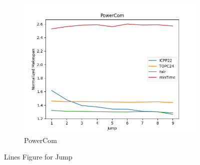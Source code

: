 \documentclass{article}
\begin{document}
\begin{figure}[htbp]
\begin{subfigure}[b]{0.32\textwidth}\includegraphics[width=\textwidth]{Results/Jump/Jump_PowerCom}\caption{PowerCom}\label{fig:lines_figures_Jump_PowerCom}\end{subfigure}
\hfill
\caption{Lines Figure for Jump}
\label{fig:lines_figures_Jump}
\end{figure}




\FloatBarrier 
\end{document}
